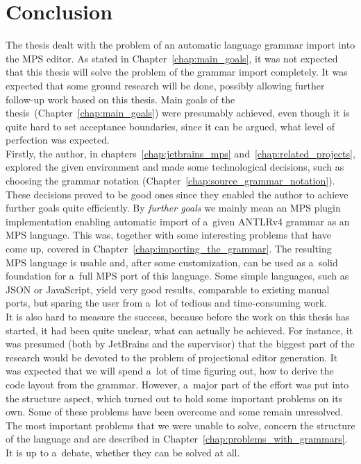 \chapter{Conclusion}

The thesis dealt with the problem of an automatic language grammar import into the MPS editor.
As stated in Chapter~\ref{chap:main_goals}, it was not expected that this thesis will solve the problem of the grammar import completely.
It was expected that some ground research will be done, possibly allowing further follow-up work based on this thesis.
Main goals of the thesis~(Chapter~\ref{chap:main_goals}) were presumably achieved, even though it is quite hard to set acceptance boundaries, since it can be argued, what level of perfection was expected.
\\

Firstly, the author, in chapters~\ref{chap:jetbrains_mps} and~\ref{chap:related_projects}, explored the given environment and made some technological decisions, such as choosing the grammar notation (Chapter~\ref{chap:source_grammar_notation}).
These decisions proved to be good ones since they enabled the author to achieve further goals quite efficiently.
By \textit{further goals} we mainly mean an MPS plugin implementation enabling automatic import of a~given ANTLRv4 grammar as an MPS language. This was, together with some interesting problems that have come up, covered in Chapter~\ref{chap:importing_the_grammar}.
The resulting MPS language is usable and, after some customization, can be used as a~solid foundation for a~full MPS port of this language.
Some simple languages, such as JSON or JavaScript, yield very good results, comparable to existing manual ports, but sparing the user from a~lot of tedious and time-consuming work.
\\

It is also hard to measure the success, because before the work on this thesis has started, it had been quite unclear, what can actually be achieved.
For instance, it was presumed (both by JetBrains and the supervisor) that the biggest part of the research would be devoted to the problem of projectional editor generation.
It was expected that we will spend a~lot of time figuring out, how to derive the code layout from the grammar.
However, a~major part of the effort was put into the structure aspect, which turned out to hold some important problems on its own.
Some of these problems have been overcome and some remain unresolved.
The most important problems that we were unable to solve, concern the structure of the language and are described in Chapter~\ref{chap:problems_with_grammars}.
It is up to a~debate, whether they can be solved at all.
\\

